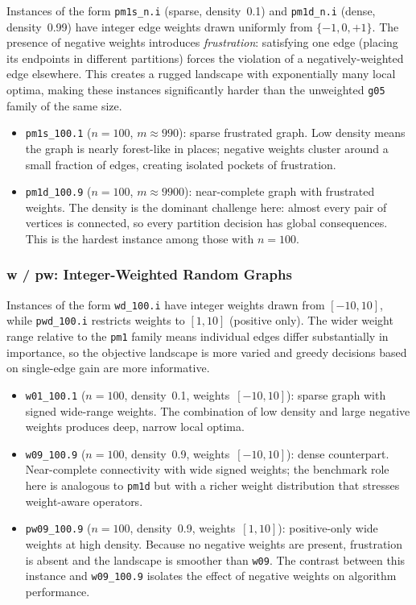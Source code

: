 \documentclass[12pt]{article}
\begin{document}
Instances of the form \texttt{pm1s\_n.i} (sparse, density~0.1) and
\texttt{pm1d\_n.i} (dense, density~0.99) have integer edge weights drawn uniformly
from $\{-1, 0, +1\}$.
The presence of negative weights introduces \emph{frustration}: satisfying one edge
(placing its endpoints in different partitions) forces the violation of a
negatively-weighted edge elsewhere.
This creates a rugged landscape with exponentially many local optima, making these
instances significantly harder than the unweighted \texttt{g05} family of the same
size.

\begin{itemize}
    \item \texttt{pm1s\_100.1} ($n=100$, $m\approx990$): sparse frustrated
          graph. Low density means the graph is nearly forest-like in places;
          negative weights cluster around a small fraction of edges, creating
          isolated pockets of frustration.
    \item \texttt{pm1d\_100.9} ($n=100$, $m\approx9900$): near-complete graph
          with frustrated weights. The density is the dominant challenge here:
          almost every pair of vertices is connected, so every partition decision
          has global consequences. This is the hardest instance among those with
          $n=100$.
\end{itemize}

\subsubsection*{w / pw: Integer-Weighted Random Graphs}

Instances of the form \texttt{wd\_100.i} have integer weights drawn from
$[-10, 10]$, while \texttt{pwd\_100.i} restricts weights to $[1, 10]$ (positive
only).
The wider weight range relative to the \texttt{pm1} family means individual edges
differ substantially in importance, so the objective landscape is more varied and
greedy decisions based on single-edge gain are more informative.

\begin{itemize}
    \item \texttt{w01\_100.1} ($n=100$, density~0.1, weights~$[-10,10]$):
          sparse graph with signed wide-range weights. The combination of low
          density and large negative weights produces deep, narrow local optima.
    \item \texttt{w09\_100.9} ($n=100$, density~0.9, weights~$[-10,10]$):
          dense counterpart. Near-complete connectivity with wide signed weights;
          the benchmark role here is analogous to \texttt{pm1d} but with a richer
          weight distribution that stresses weight-aware operators.
    \item \texttt{pw09\_100.9} ($n=100$, density~0.9, weights~$[1,10]$):
          positive-only wide weights at high density. Because no negative weights
          are present, frustration is absent and the landscape is smoother than
          \texttt{w09}. The contrast between this instance and \texttt{w09\_100.9}
          isolates the effect of negative weights on algorithm performance.
\end{itemize}
\end{document}
